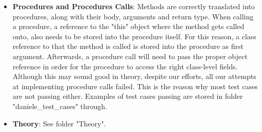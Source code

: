 \documentclass[paper=a4, fontsize=11pt]{scrartcl}
\numberwithin{equation}{section}		%
\numberwithin{figure}{section}			%
\numberwithin{table}{section}				%
\begin{document}
\begin{itemize}
\item \textbf{Procedures and Procedures Calls}: Methods are correctly translated into procedures, along with their body, arguments and return type. When calling a procedure, a reference to the "this" object where the method gets called onto, also needs to be stored into the procedure itself. For this reason, a class reference to that the method is called is stored into the procedure as first argument. Afterwards, a procedure call will need to pass the proper object reference in order for the procedure to access the right class-level fields. Although this may sound good in theory, despite our efforts, all our attempts at implementing procedure calls failed. This is the reason why most test cases are not passing either.  Examples of test cases passing are stored in folder "daniele\_test\_cases" through. 
\item \textbf{Theory}: See folder "Theory".
	

	
\end{itemize}
\end{document}
